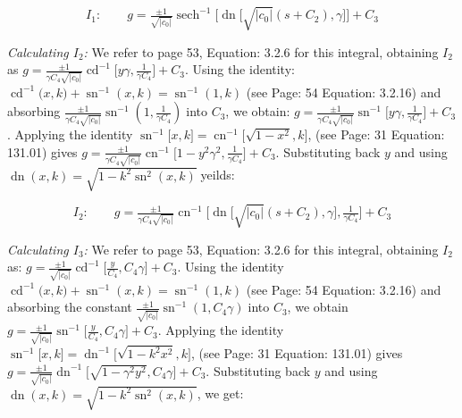 \documentclass[12pt]{article}
\theoremstyle{plain}
\theoremstyle{definition}
\theoremstyle{remark}
\begin{document}
 \begin{equation}\label{eqn: soln k<0, c_0 neq 0, g: case 2.1}
 	\boxed{I_1:\qquad g=\tfrac{\pm 1}{\sqrt{|c_0|}}\operatorname{sech}^{-1}\big[\operatorname{dn}\big[\sqrt{|c_0|}(s+C_2),\gamma\big]\big]+C_3}
 \end{equation}
 
 \textit{Calculating \(I_2\): } We refer to \cite{La} page 53, Equation: 3.2.6 for this integral, obtaining \(I_2\) as \footnotesize\(g=\tfrac{\pm 1}{\gamma C_4\sqrt{|c_0|}} \operatorname{cd}^{-1}\big[y\gamma,\tfrac{1}{\gamma C_4}\big] + C_3\)\normalsize. Using the identity: \(\operatorname{cd}^{-1}\!\big(x,k\big)+\operatorname{sn}^{-1}(x,k)=\operatorname{sn}^{-1}(1,k)\) (see \cite{La} Page: 54 Equation: 3.2.16) and absorbing \footnotesize\(\tfrac{\pm 1}{\gamma C_4\sqrt{|c_0|}}\operatorname{sn}^{-1}(1,\tfrac{1}{\gamma C_4})\;\)\normalsize into \(C_3\), we obtain: \footnotesize\(g=\tfrac{\pm 1}{\gamma C_4\sqrt{|c_0|}} \operatorname{sn}^{-1}\big[y\gamma,\tfrac{1}{\gamma C_4}\big] + C_3\)\normalsize. Applying the identity \footnotesize\(\operatorname{sn}^{-1}\big[x,k\big]=\operatorname{cn}^{-1}\big[\sqrt{1-x^2},k\big]\)\normalsize, (see \cite{BF} Page: 31 Equation: 131.01) gives \footnotesize\(g=\tfrac{\pm 1}{\gamma C_4\sqrt{|c_0|}} \operatorname{cn}^{-1}\big[1-y^2\gamma^2,\tfrac{1}{\gamma C_4}\big] + C_3\)\normalsize. Substituting back \(y\) and using \footnotesize\(\operatorname{dn}(x,k)=\sqrt{1-k^2\operatorname{sn}^2(x,k)}\;\)\normalsize yeilds:
 
 \begin{equation}\label{eqn: soln k<0, c_0 neq 0, g: case 2.2}
 	\boxed{I_2:\qquad g=\tfrac{\pm 1}{\gamma C_4\sqrt{|c_0|}} \operatorname{cn}^{-1}\big[\operatorname{dn}\big[\sqrt{|c_0|}(s+C_2),\gamma\big],\tfrac{1}{\gamma C_4}\big] + C_3}
 \end{equation}

 \textit{Calculating \(I_3\): } We refer to \cite{La} page 53, Equation: 3.2.6 for this integral, obtaining \(I_2\) as: \footnotesize\(g=\tfrac{\pm 1}{\sqrt{|c_0|}} \operatorname{cd}^{-1}\big[\tfrac{y}{C_4},C_4 \gamma\big] + C_3\)\normalsize. Using the identity \(\operatorname{cd}^{-1}\!\big(x,k\big)+\operatorname{sn}^{-1}(x,k)=\operatorname{sn}^{-1}(1,k)\) (see \cite{La} Page: 54 Equation: 3.2.16) and absorbing the constant \footnotesize\(\tfrac{\pm 1}{\sqrt{|c_0|}}\operatorname{sn}^{-1}(1,C_4 \gamma)\;\)\normalsize into \(C_3\), we obtain \footnotesize\(g=\tfrac{\pm 1}{\sqrt{|c_0|}} \operatorname{sn}^{-1}\big[\tfrac{y}{C_4},C_4 \gamma\big] + C_3\)\normalsize. Applying the identity \footnotesize\(\operatorname{sn}^{-1}\big[x,k\big]=\operatorname{dn}^{-1}\big[\sqrt{1-k^2x^2},k\big]\)\normalsize, (see \cite{BF} Page: 31 Equation: 131.01) gives \footnotesize\(g=\tfrac{\pm 1}{\sqrt{|c_0|}} \operatorname{dn}^{-1}\big[\sqrt{1-\gamma^2 y^2},C_4 \gamma\big] + C_3\)\normalsize. Substituting back \(y\) and using \footnotesize\(\operatorname{dn}(x,k)=\sqrt{1-k^2\operatorname{sn}^2(x,k)}\)\normalsize, we get:
 
\end{document}
